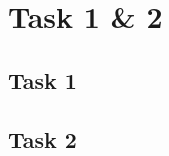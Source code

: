 \documentclass[final]{scrreprt} %
\begin{document}
\chapter{Task 1 \& 2}
\label{ch:mod3-tsk1-2}

\section{Task 1}
\label{sec:mod3-tsk1}

\section{Task 2}
\label{sec:mod3-tsk2}
\end{document}

